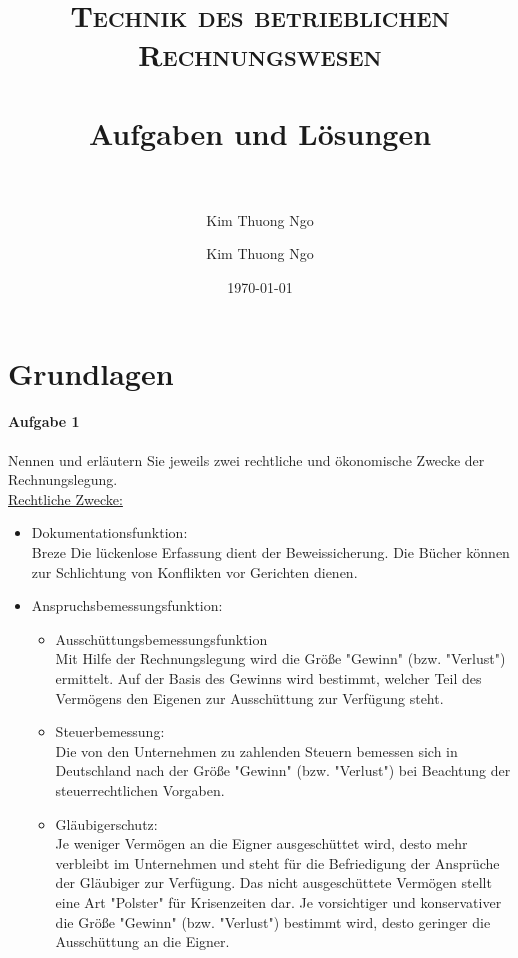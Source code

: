 \documentclass[paper=a4, fontsize=11pt]{scrartcl}
\author{Kim Thuong Ngo}
\title{	
\normalfont \normalsize 
\textsc{Technik des betrieblichen Rechnungswesen} \\ [25pt] 
\horrule{0.5pt} \\[0.4cm] 
\huge Aufgaben und Lösungen\\ 
\horrule{2pt} \\[0.5cm] 
}
\author{Kim Thuong Ngo}
\date{\normalsize\today}
\numberwithin{equation}{section}
\numberwithin{figure}{section}
\numberwithin{table}{section}
\begin{document}
\maketitle
\newpage
\tableofcontents
\newpage
\section{Grundlagen}
\paragraph{Aufgabe 1} 
Nennen und erläutern Sie jeweils zwei rechtliche und ökonomische Zwecke der Rechnungslegung. \\

\underline{Rechtliche Zwecke:}
\begin{itemize}
\item Dokumentationsfunktion: \\
Breze
Die lückenlose Erfassung dient der Beweissicherung. Die Bücher können zur Schlichtung von Konflikten vor Gerichten dienen.

\item Anspruchsbemessungsfunktion:
  \begin{itemize}
  \item Ausschüttungsbemessungsfunktion \\
Mit Hilfe der Rechnungslegung wird die Größe "Gewinn" (bzw. "Verlust") ermittelt. Auf  der Basis des Gewinns wird bestimmt, welcher Teil des Vermögens den Eigenen zur Ausschüttung zur Verfügung steht.
  \item Steuerbemessung: \\
Die von den Unternehmen zu zahlenden Steuern bemessen sich in Deutschland nach der Größe "Gewinn" (bzw. "Verlust") bei Beachtung der steuerrechtlichen Vorgaben.
  \item Gläubigerschutz: \\
Je weniger Vermögen an die Eigner ausgeschüttet wird, desto mehr verbleibt im Unternehmen und steht für die Befriedigung der Ansprüche der Gläubiger zur Verfügung. Das nicht ausgeschüttete Vermögen stellt eine Art "Polster" für Krisenzeiten dar. Je vorsichtiger und konservativer die Größe "Gewinn" (bzw. "Verlust") bestimmt wird, desto geringer die Ausschüttung an die Eigner.
\end{itemize}
\end{itemize}
\end{document}
